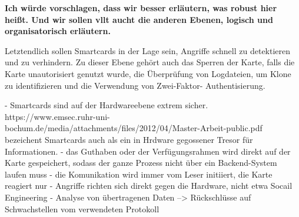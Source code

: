 \textbf{Ich würde vorschlagen, dass wir besser erläutern, was robust hier heißt. Und wir sollen vllt
aucht die anderen Ebenen, logisch und organisatorisch erläutern.}


Letztendlich sollen Smartcards in der Lage sein, Angriffe schnell zu detektieren und zu verhindern.
Zu dieser Ebene gehört auch das Sperren der Karte, falls die Karte unautorisiert genutzt wurde, 
die Überprüfung von Logdateien, um Klone zu identifizieren und die Verwendung von Zwei-Faktor-
Authentisierung.


- Smartcards sind auf der Hardwareebene extrem sicher. https://www.emsec.ruhr-uni-bochum.de/media/attachments/files/2012/04/Master-Arbeit-public.pdf bezeichent Smartcards auch als 
  ein in Hrdware gegossener Tresor für Informationen. 
- das Guthaben oder der Verfügungsrahmen wird direkt auf der Karte gespeichert, sodass der ganze Prozess nicht über ein Backend-System laufen muss
- die Komunikation wird immer vom Leser initiiert, die Karte reagiert nur
- Angriffe richten sich direkt gegen die Hardware, nicht etwa Socail Engineering 
- Analyse von übertragenen Daten --> Rückschlüsse auf Schwachstellen vom verwendeten Protokoll

